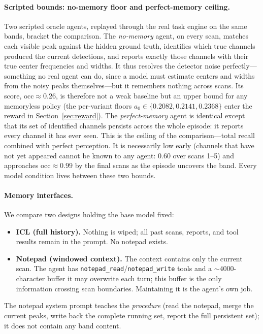 \documentclass[11pt]{article}
\newcommand{\occ}{\ensuremath{\mathrm{occ}}}
\begin{document}
\paragraph{Scripted bounds: no-memory floor and perfect-memory ceiling.}
Two scripted oracle agents, replayed through the real task engine on the same
bands, bracket the comparison. The \emph{no-memory} agent, on every scan, matches
each visible peak against the hidden ground truth, identifies which true channels
produced the current detections, and reports exactly those channels with their true
center frequencies and widths. It thus resolves the detector noise
perfectly---something no real agent can do, since a model must estimate centers and
widths from the noisy peaks themselves---but it remembers nothing across scans. Its
score, $\occ \approx 0.26$, is therefore not a weak baseline but an upper bound for
any memoryless policy (the per-variant floors $a_0 \in \{0.2082, 0.2141, 0.2368\}$
enter the reward in Section~\ref{sec:reward}). The \emph{perfect-memory} agent is
identical except that its set of identified channels persists across the whole
episode: it reports every channel it has ever seen. This is the ceiling of the
comparison---total recall combined with perfect perception. It is necessarily low
early (channels that have not yet appeared cannot be known to any agent: $0.60$
over scans 1--5) and approaches $\occ \approx 0.99$ by the final scans as the
episode uncovers the band. Every model condition lives between these two bounds.

\paragraph{Memory interfaces.}
We compare two designs holding the base model fixed:
\begin{itemize}
\item \textbf{ICL (full history).} Nothing is wiped; all past scans, reports, and
tool results remain in the prompt. No notepad exists.
\item \textbf{Notepad (windowed context).} The context contains only the current
scan. The agent has \texttt{notepad\_read}/\texttt{notepad\_write} tools and a
${\sim}4000$-character buffer it may overwrite each turn; this buffer is the only
information crossing scan boundaries. Maintaining it is the agent's own job.
\end{itemize}
The notepad system prompt teaches the \emph{procedure} (read the notepad, merge the
current peaks, write back the complete running set, report the full persistent
set); it does not contain any band content.
\end{document}
